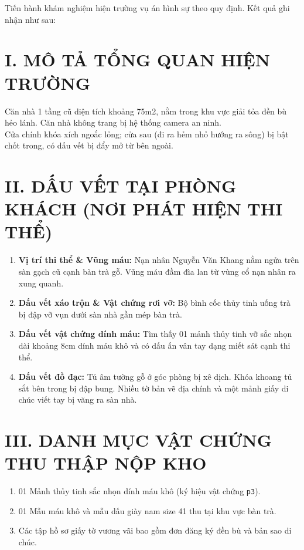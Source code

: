 \documentclass[12pt,a4paper]{article}
\begin{document}
\noindent Tiến hành khám nghiệm hiện trường vụ án hình sự theo quy định. Kết quả ghi nhận như sau:

\section*{I. MÔ TẢ TỔNG QUAN HIỆN TRƯỜNG}
Căn nhà 1 tầng cũ diện tích khoảng 75m2, nằm trong khu vực giải tỏa đền bù hẻo lánh. Căn nhà không trang bị hệ thống camera an ninh.\\
Cửa chính khóa xích ngoắc lỏng; cửa sau (đi ra hẻm nhỏ hướng ra sông) bị bật chốt trong, có dấu vết bị đẩy mở từ bên ngoài.

\section*{II. DẤU VẾT TẠI PHÒNG KHÁCH (NƠI PHÁT HIỆN THI THỂ)}
\begin{enumerate}[label=\arabic*., leftmargin=1.5cm]
    \item \textbf{Vị trí thi thể \& Vũng máu:} Nạn nhân Nguyễn Văn Khang nằm ngửa trên sàn gạch cũ cạnh bàn trà gỗ. Vũng máu đầm đìa lan từ vùng cổ nạn nhân ra xung quanh.
    \item \textbf{Dấu vết xáo trộn \& Vật chứng rơi vỡ:} Bộ bình cốc thủy tinh uống trà bị đập vỡ vụn dưới sàn nhà gần mép bàn trà.
    \item \textbf{Dấu vết vật chứng dính máu:} Tìm thấy 01 mảnh thủy tinh vỡ sắc nhọn dài khoảng 8cm dính máu khô và có dấu ấn vân tay dạng miết sát cạnh thi thể.
    \item \textbf{Dấu vết đồ đạc:} Tủ âm tường gỗ ở góc phòng bị xê dịch. Khóa khoang tủ sắt bên trong bị đập bung. Nhiều tờ bản vẽ địa chính và một mảnh giấy di chúc viết tay bị văng ra sàn nhà.
\end{enumerate}

\section*{III. DANH MỤC VẬT CHỨNG THU THẬP NỘP KHO}
\begin{enumerate}[label=\arabic*., leftmargin=1.5cm]
    \item 01 Mảnh thủy tinh sắc nhọn dính máu khô (ký hiệu vật chứng \texttt{p3}).
    \item 01 Mẫu máu khô và mẫu dấu giày nam size 41 thu tại khu vực bàn trà.
    \item Các tập hồ sơ giấy tờ vương vãi bao gồm đơn đăng ký đền bù và bản sao di chúc.
\end{enumerate}
\end{document}
